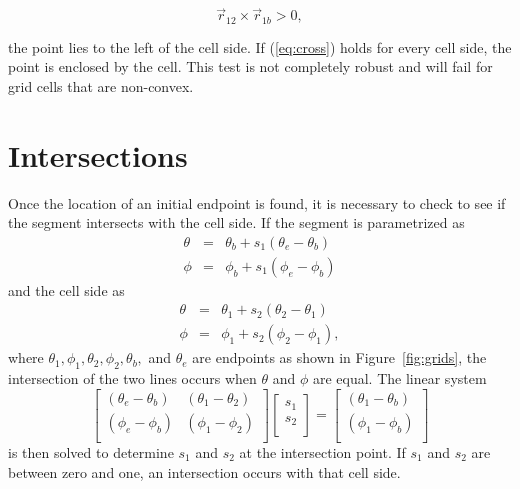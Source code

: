 \begin{description}
\begin{equation}\label{eq:cross}
\vec{r}_{12} \times \vec{r}_{1b} > 0,
\end{equation}

     the point lies to the left of the cell side.  If (\ref{eq:cross}) holds for
     every cell side, the point is enclosed by the cell.  This test is not
     completely robust and will fail for grid cells that are non-convex.

\section{Intersections}\label{sec:intersect}

     Once the location of an initial endpoint is found, it is necessary to check
     to see if the segment intersects with the cell side.  If the segment is
     parametrized as
\begin{eqnarray}
\theta &=& \theta_b + s_1 (\theta_e - \theta_b) \nonumber \\
\phi   &=& \phi_b + s_1 (\phi_e - \phi_b) 
\end{eqnarray}
     and the cell side as
\begin{eqnarray}
\theta &=& \theta_1 + s_2 (\theta_2 - \theta_1) \nonumber \\
\phi   &=& \phi_1 + s_2 (\phi_2 - \phi_1),
\end{eqnarray}
     where $\theta_1, \phi_1, \theta_2, \phi_2, \theta_b,$ and $\theta_e$ are
     endpoints as shown in Figure~\ref{fig:grids}, the intersection of the two
     lines occurs when $\theta$ and $\phi$ are equal.  The linear system 
\begin{equation}
\left[ \begin{array}{cc} 
(\theta_e - \theta_b) & (\theta_1 - \theta_2) \\
(\phi_e - \phi_b) & (\phi_1 - \phi_2) \\
\end{array} \right]
\left[ \begin{array}{c} s_1 \\ s_2 \\ \end{array} \right] = 
\left[ \begin{array}{c} 
(\theta_1 - \theta_b) \\ (\phi_1 - \phi_b)  \\
\end{array} \right]
\end{equation}
     is then solved to determine $s_1$ and $s_2$ at the intersection point.  If
     $s_1$ and $s_2$ are between zero and one, an intersection occurs with that
     cell side. 


\end{description}
